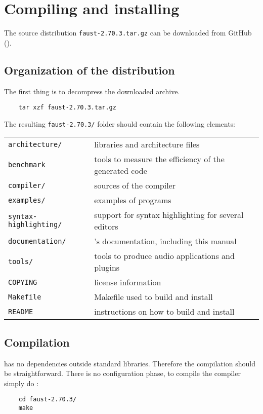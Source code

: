 \chapter{Compiling and installing \faust}
\label{install}


The \faust source distribution \lstinline'faust-2.70.3.tar.gz' can be downloaded from GitHub ().

\section{Organization of the distribution}
The first thing is to decompress the downloaded archive. 
\begin{lstlisting}
	tar xzf faust-2.70.3.tar.gz
\end{lstlisting}

The resulting \lstinline'faust-2.70.3/' folder should contain the following elements:

\begin{tabular}{ll}
	\lstinline'architecture/' 		&\faust libraries and architecture files\\
	\lstinline'benchmark'			&tools to measure the efficiency of the generated code\\
	\lstinline'compiler/'			&sources of the \faust compiler\\
	\lstinline'examples/'			&examples of \faust programs\\
	\lstinline'syntax-highlighting/'&	support for syntax highlighting for several editors\\
	\lstinline'documentation/' 		&\faust's documentation, including this manual\\
	\lstinline'tools/'				&tools to produce audio applications and plugins\\
	\lstinline'COPYING'			&license information\\
	\lstinline'Makefile'			&Makefile used to build and install \faust\\
	\lstinline'README'			&instructions on how to build and install \faust
\end{tabular}

\section{Compilation}
\faust has no dependencies outside standard libraries. Therefore the compilation should be straightforward. There is no configuration phase, to compile the \faust compiler simply do :
\begin{lstlisting}
	cd faust-2.70.3/
	make
\end{lstlisting}

